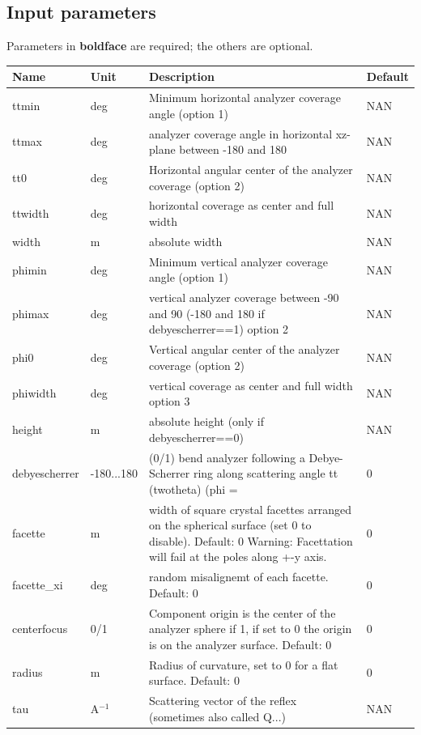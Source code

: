 \subsection*{Input parameters}
Parameters in \textbf{boldface} are required; the others are optional.

\begin{longtable}{p{}p{}p{}p{}}
\toprule
\textbf{Name} & \textbf{Unit} & \textbf{Description} & \textbf{Default} \\
\midrule
\endhead
ttmin & deg & Minimum horizontal analyzer coverage angle (option 1) & NAN \\
ttmax & deg & analyzer coverage angle in horizontal xz-plane between -180 and 180 & NAN \\
tt0 & deg & Horizontal angular center of the analyzer coverage (option 2) & NAN \\
ttwidth & deg & horizontal coverage as center and full width & NAN \\
width & m & absolute width & NAN \\
phimin & deg & Minimum vertical analyzer coverage angle (option 1) & NAN \\
phimax & deg & vertical analyzer coverage between -90 and 90 (-180 and 180 if debyescherrer==1) option 2 & NAN \\
phi0 & deg & Vertical angular center of the analyzer coverage (option 2) & NAN \\
phiwidth & deg & vertical coverage as center and full width option 3 & NAN \\
height & m & absolute height (only if debyescherrer==0) & NAN \\
debyescherrer & -180...180 & (0/1)   bend analyzer following a Debye-Scherrer ring along scattering angle tt (twotheta) (phi = & 0 \\
facette & m & width of square crystal facettes arranged on the spherical surface (set 0 to disable). Default: 0 Warning: Facettation will fail at the poles along +-y axis. & 0 \\
facette\_xi & deg & random misalignemt of each facette. Default: 0 & 0 \\
centerfocus & 0/1 & Component origin is the center of the analyzer sphere if 1, if set to 0 the origin is on the analyzer surface. Default: 0 & 0 \\
radius & m & Radius of curvature, set to 0 for a flat surface. Default: 0 & 0 \\
tau & A$^{-1}$ & Scattering vector of the reflex (sometimes also called Q...) & NAN \\

\end{longtable}
